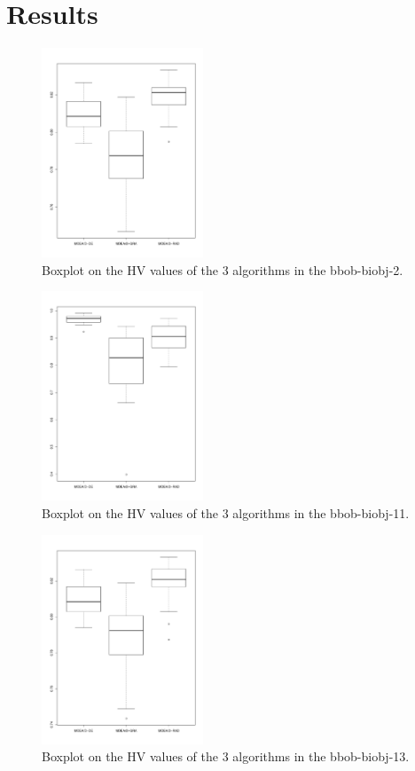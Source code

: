\section{Results}


\begin{figure}[!t]
	\centering
	\includegraphics[width=0.43\textwidth, height=0.35\textwidth]{img/boxplot_bibbob2_2.pdf}
	\caption{Boxplot on the HV values of the 3 algorithms in the bbob-biobj-2.}
	\label{fig4}
\end{figure}

\begin{figure}[!t]
	\centering
	\includegraphics[width=0.43\textwidth, height=0.35\textwidth]{img/boxplot_BiObjBBOB11_2.pdf}
	\caption{Boxplot on the HV values of the 3 algorithms in the bbob-biobj-11.}
	\label{fig5}
\end{figure}

\begin{figure}[!t]
	\centering
	\includegraphics[width=0.43\textwidth, height=0.35\textwidth]{img/boxplot_BiObjBBOB13_2.pdf}
	\caption{Boxplot on the HV values of the 3 algorithms in the bbob-biobj-13.}
	\label{fig6}
\end{figure}

